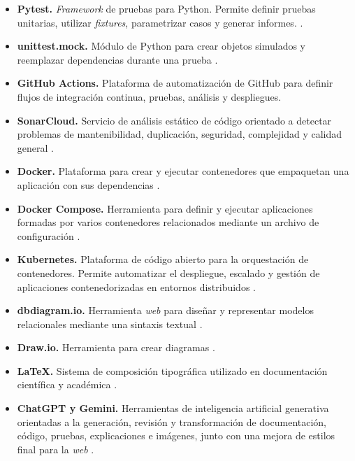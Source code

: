 \begin{itemize}
	\item \textbf{Pytest.} \textit{Framework} de pruebas para Python. Permite definir pruebas unitarias, utilizar \textit{fixtures}, parametrizar casos y generar informes. \cite{pytest_docs}.
	
	\item \textbf{unittest.mock.} Módulo de Python para crear objetos simulados y reemplazar dependencias durante una prueba \cite{python_unittest_mock_docs}.
	
	\item \textbf{GitHub Actions.} Plataforma de automatización de GitHub para definir flujos de integración continua, pruebas, análisis y despliegues\cite{githubactions}.
	
	\item \textbf{SonarCloud.} Servicio de análisis estático de código orientado a detectar problemas de mantenibilidad, duplicación, seguridad, complejidad y calidad general \cite{sonarcloud}.
	
	\item \textbf{Docker.} Plataforma para crear y ejecutar contenedores que empaquetan una aplicación con sus dependencias \cite{docker}. 
	\item \textbf{Docker Compose.} Herramienta para definir y ejecutar aplicaciones formadas por varios contenedores relacionados mediante un archivo de configuración \cite{dockercompose}.
	
	\item \textbf{Kubernetes.} Plataforma de código abierto para la orquestación de contenedores. Permite automatizar el despliegue, escalado y gestión de aplicaciones contenedorizadas en entornos distribuidos \cite{kubernetes_docs}.
	
	\item \textbf{dbdiagram.io.} Herramienta \textit{web} para diseñar y representar modelos relacionales mediante una sintaxis textual \cite{dbdiagram_docs}.
	
	\item \textbf{Draw.io.} Herramienta para crear diagramas \cite{drawio_docs}.
	
	\item \textbf{LaTeX.} Sistema de composición tipográfica utilizado en documentación científica y académica \cite{wiki:latex}.
	
	\item \textbf{ChatGPT y Gemini.} Herramientas de inteligencia artificial generativa orientadas a la generación, revisión y transformación de documentación, código, pruebas, explicaciones e imágenes, junto con una mejora de estilos final para la \textit{web} \cite{google_gemini, openai_chatgpt}.
	
\end{itemize}